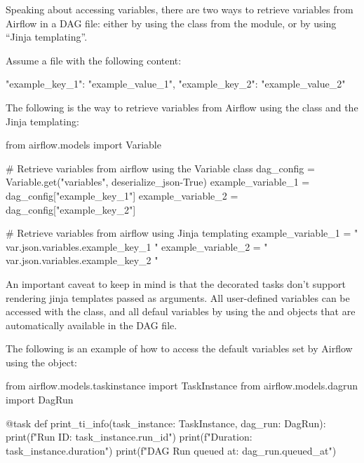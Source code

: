 Speaking about accessing variables, there are two ways to retrieve variables from Airflow in a DAG file: either by using
the  class from the  module, or by using ``Jinja templating''.

\be
Assume a  file with the following content:
\begin{block}
{
    "example_key_1": "example_value_1",
    "example_key_2": "example_value_2"
}
\end{block}

The following is the way to retrieve variables from Airflow using the  class and the Jinja templating:
\begin{block}
from airflow.models import Variable

# Retrieve variables from airflow using the Variable class
dag_config = Variable.get("variables", deserialize_json-True)
example_variable_1 = dag_config["example_key_1"]
example_variable_2 = dag_config["example_key_2"]

# Retrieve variables from airflow using Jinja templating
example_variable_1 = "{{ var.json.variables.example_key_1 }}"
example_variable_2 = "{{ var.json.variables.example_key_2 }}"
\end{block}
\ee

An important caveat to keep in mind is that the  decorated tasks don't support rendering jinja templates
passed as arguments. All user-defined variables can be accessed with the  class, and all defaul variables
by using the  and  objects that are automatically available in the DAG file.

\be
The following is an example of how to access the default variables set by Airflow using the  object:
\begin{block}
from airflow.models.taskinstance import TaskInstance
from airflow.models.dagrun import DagRun

@task
def print_ti_info(task_instance: TaskInstance, dag_run: DagRun):
    print(f"Run ID: {task_instance.run_id}")
    print(f"Duration: {task_instance.duration}")
    print(f"DAG Run queued at: {dag_run.queued_at}")
\end{block}
\ee